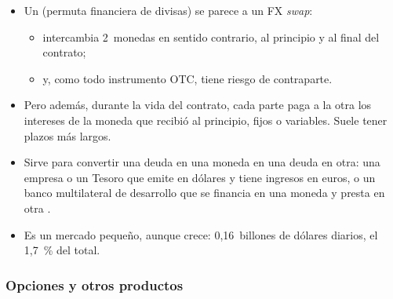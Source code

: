 \documentclass[11pt]{article}
\begin{document}
\begin{itemize}
\item Un  (permuta financiera de divisas) se parece a un FX \emph{swap}:
  \begin{itemize}
  \item intercambia 2~monedas en sentido contrario, al principio y al final del contrato;
  \item y, como todo instrumento OTC, tiene riesgo de contraparte.
  \end{itemize}
\item Pero además, durante la vida del contrato, cada parte paga a la otra los intereses de la moneda que recibió al principio, fijos o variables. Suele tener plazos más largos.
\item Sirve para convertir una deuda en una moneda en una deuda en otra: una empresa o un Tesoro que emite en dólares y tiene ingresos en euros, o un banco multilateral de desarrollo que se financia en una moneda y presta en otra .
\item Es un mercado pequeño, aunque crece: 0,16~billones de dólares diarios, el 1,7~\% del total\nocite{BIS2026TrienalDatos}.
\end{itemize}

\subsubsection{Opciones y otros productos}\label{sec:opciones-divisas}
\end{document}
